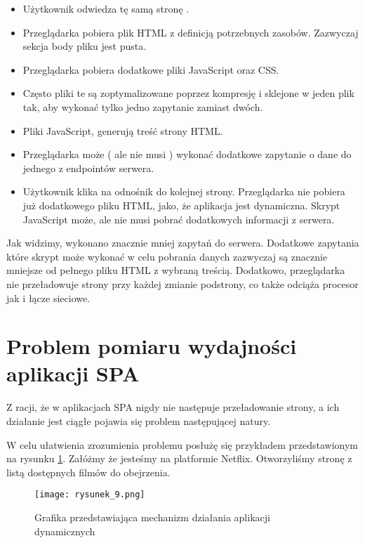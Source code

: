 \begin{itemize}
    \item Użytkownik odwiedza tę samą stronę .
    \item Przeglądarka pobiera plik HTML z definicją potrzebnych zasobów. Zazwyczaj sekcja body pliku jest pusta.
    \item Przeglądarka pobiera dodatkowe pliki JavaScript oraz CSS.
    \item Często pliki te są zoptymalizowane poprzez kompresję i sklejone w jeden plik tak, aby wykonać tylko jedno zapytanie zamiast dwóch.
    \item Pliki JavaScript, generują treść strony HTML.
    \item Przeglądarka może ( ale nie musi ) wykonać dodatkowe zapytanie o dane do jednego z endpointów serwera.
    \item Użytkownik klika na odnośnik do kolejnej strony. Przeglądarka nie pobiera już dodatkowego pliku HTML, jako, że aplikacja jest dynamiczna. Skrypt JavaScript może, ale nie musi pobrać dodatkowych informacji z serwera.    
\end{itemize}

Jak widzimy, wykonano znacznie mniej zapytań do serwera. Dodatkowe zapytania które skrypt może wykonać w celu pobrania danych zazwyczaj są znacznie mniejsze od pełnego pliku HTML z wybraną treścią.
Dodatkowo, przeglądarka nie przeładowuje strony przy każdej zmianie podstrony, co także odciąża procesor jak i łącze sieciowe.

\section{Problem pomiaru wydajności aplikacji SPA}

Z racji, że w aplikacjach SPA nigdy nie następuje przeładowanie strony, a ich działanie jest ciągłe pojawia się problem następującej natury. 

W celu ułatwienia zrozumienia problemu posłużę się przykładem przedstawionym na rysunku \ref{fig:rysunek_9}. Załóżmy że jesteśmy na platformie Netflix. Otworzyliśmy stronę z listą dostępnych filmów do obejrzenia. 

\begin{figure}[htbp]
    \centering
    \advance\leftskip-2cm
    \texttt{[image: rysunek\_9.png]}
    \caption{Grafika przedstawiająca mechanizm działania aplikacji dynamicznych}
    \label{fig:rysunek_9}
\end{figure}

